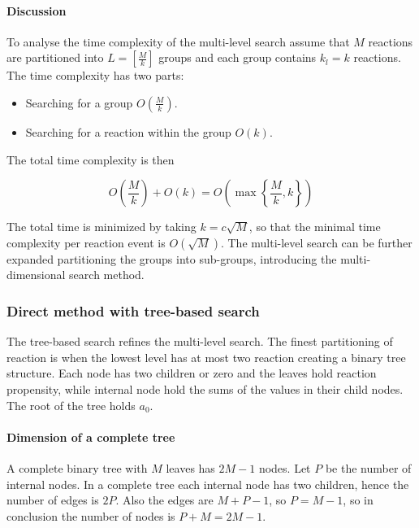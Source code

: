       

      \paragraph{Discussion}
      To analyse the time complexity of the multi-level search assume that $M$ reactions are partitioned into $L = \left[\frac{M}{k}\right]$ groups and each group contains $k_l=k$ reactions.
      The time complexity has two parts:

      \begin{multicols}{2}
        \begin{itemize}
          \item Searching for a group $O\left(\frac{M}{k}\right)$.
          \item Searching for a reaction within the group $O(k)$.
        \end{itemize}
      \end{multicols}

      The total time complexity is then

      $$O\left(\frac{M}{k}\right) + O(k) = O(\max\left\{\frac{M}{k}, k\right\})$$

      The total time is minimized by taking $k = c\sqrt{M}$, so that the minimal time complexity per reaction event is $O(\sqrt{M})$.
      The multi-level search can be further expanded partitioning the groups into sub-groups, introducing the multi-dimensional search method.

    \subsubsection{Direct method with tree-based search}
    The tree-based search refines the multi-level search.
    The finest partitioning of reaction is when the lowest level has at most two reaction creating a binary tree structure.
    Each node has two children or zero and the leaves hold reaction propensity, while internal node hold the sums of the values in their child nodes.
    The root of the tree holds $a_0$.

      \paragraph{Dimension of a complete tree}
      A complete binary tree with $M$ leaves has $2M-1$ nodes.
      Let $P$ be the number of internal nodes.
      In a complete tree each internal node has two children, hence the number of edges is $2P$.
      Also the edges are $M+P-1$, so $P = M-1$, so in conclusion the number of nodes is $P+M = 2M-1$.

